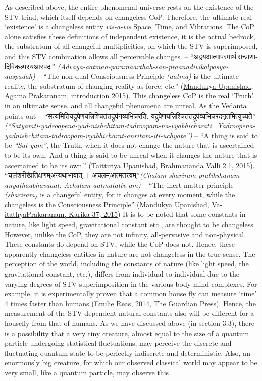 \documentclass[twoside, 13pt]{article}
\begin{document}
{{As described above, the entire phenomenal universe rests on the existence of the STV triad, which itself depends on changeless CoP. Therefore, the ultimate real ‘existence’ is a changeless entity \textit{vis-a-vis} Space, Time, and Vibrations. The CoP alone satisfies these definitions of independent existence, it is the actual bedrock, the substratum of all changeful multiplicities, on which the STV is superimposed, and this STV combination allows all perceivable changes. – \foreignlanguage{hindi}{{\fontsize{9}{11}\selectfont “अद्वयआत्मापरमार्थःसन्प्राणादिविकल्पस्यआस्पदः”}} \textit{(Advaya-aatmaa-paramaarthah-san-praanadivikalpasya- aaspadah)} – “The non-dual Consciousness Principle \textit{(aatma)} is the ultimate reality, the substratum of changing reality as force, etc.” (\underline{Mandukya Upanishad, Agama Prakaranam, introduction 2015}). This changeless CoP is the real ‘Truth’ in an ultimate sense, and all changeful phenomena are unreal. As the Vedanta points out – \foreignlanguage{hindi}{{\fontsize{9}{11}\selectfont “सत्यमितियद्रूपेणयन्निश्चितंतद्रूपंनव्यभिचरति.  यद्रूपेणयन्निश्चितंतद्रूपंव्यभिचरदनृतमित्युच्यते”}} \textit{(“Satyamti-yadroopena-yad-nishchitam-tadroopam-na-vyabhicharati.~Yadroopena-yad\break nishchitam-tadroopam-vyabhicharat-anritam-iti-uchyate”)} – “A thing is said to be \textit{“Sat-\break yam”}, the Truth, when it does not change the nature that is ascertained to be its own. And a thing is said to be unreal when it changes the nature that is ascertained to be its own.” (\underline{Taittiriya Upanishad, Brahmananda Valli 2.1, 2015}). \foreignlanguage{hindi}{{\fontsize{9}{11}\selectfont “चलंशरीरंप्रतिक्षणम्अन्यथाभावात् । अचलम्आत्मतत्त्वम्”}}\textit{(Chalam-shariram-pratikshanam-anyathaabhavaaat. Achalam-aatmatattv-\break am)} – “The inert matter principle \textit{(shariram)} is a changeful entity, for it changes at every moment, while the changeless is the Consciousness Principle” (\underline{Mandukya Upanishad, Va-} \underline{itathyaPrakaranam, Karika 37, 2015}) It is to be noted that some constants in nature, like light speed, gravitational constant etc., are thought to be changeless. However, unlike the CoP, they are not infinity, all-pervasive and non-physical. These constants do depend on STV, while the CoP does not. Hence, these apparently changeless entities in nature are not changeless in the true sense. The perception of the world, including the constants of nature (like light speed, the gravitational constant, etc.), differs from individual to individual due to the varying degrees of STV superimposition in the various body-mind complexes. For example, it is experimentally proven that a common house ﬂy can measure ‘time’ 4 times faster than humans (\underline{Emilie Reas, 2014, The Guardian Press}). Hence, the measurement of the STV-dependent natural constants also will be different for a housefly from that of humans. As we have discussed above (in section 3.3), there is a possibility that a very tiny creature, almost equal to the size of a quantum particle undergoing statistical fluctuations, may perceive the discrete and fluctuating quantum state to be perfectly indiscrete and deterministic. Also, an enormously big creature, for which our observed classical world may appear to be very small, like a quantum particle, may observe this }}
\end{document}
